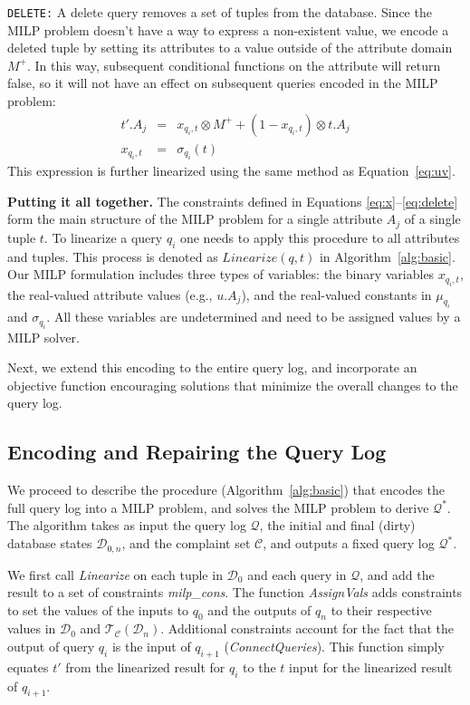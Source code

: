 \smallskip
\noindent
\texttt{DELETE:}
A delete query removes a set of tuples from the database.  
Since the MILP problem doesn't have a way to express a non-existent value, 
we encode a deleted tuple by setting its attributes to a value
outside of the attribute domain $M^+$.  In this way, subsequent conditional functions
on the attribute will return false, so it will not have an effect on subsequent queries encoded
in the MILP problem:
\begin{eqnarray}
\label{eq:delete}
t'.A_j &=& x_{q_i, t} \otimes M^+ + (1-x_{q_i, t}) \otimes t.A_j \\
x_{q_i, t} &=& \sigma_{q_i}(t)\nonumber 
\end{eqnarray}
This expression is further linearized using the same method as Equation~\eqref{eq:uv}.

\smallskip
\noindent
\textbf{Putting it all together.}
The constraints defined in Equations \eqref{eq:x}--\eqref{eq:delete}
form the main structure of the MILP problem for a single attribute
$A_j$ of a single tuple $t$. To linearize a query $q_i$ one needs to
apply this procedure to all attributes and tuples. This process is
denoted as $Linearize(q, t)$ in Algorithm~\ref{alg:basic}. Our MILP
formulation includes three types of variables: the binary variables
$x_{q_i, t}$, the real-valued attribute values (e.g., $u.A_j$), and
the real-valued constants in $\mu_{q_i}$ and $\sigma_{q_i}$. All these
variables are undetermined and need to be assigned values by a MILP
solver.


Next, we extend this encoding to the entire query log,
and incorporate an objective function encouraging solutions
that minimize the overall changes to the query log.







\subsection{Encoding and Repairing the Query Log}
\label{sec:milp}

We proceed to describe the procedure (Algorithm~\ref{alg:basic}) that encodes 
the full query log into a MILP problem, and solves the MILP problem to derive $\mathcal{Q}^*$.
The algorithm takes as input the query log $\mathcal{Q}$, 
the initial and final (dirty) database states 
$\mathcal{D}_{0, n}$, and the complaint set $\mathcal{C}$, and outputs a fixed query 
log $\mathcal{Q}^*$.  

We first call \textit{Linearize} on each tuple in $\mathcal{D}_0$ and
each query in $\mathcal{Q}$, and add the result to a set of
constraints \textit{milp\_cons}. The function \textit{AssignVals} adds
constraints to set the values of the inputs to $q_0$ and the outputs
of $q_n$ to their respective values in $\mathcal{D}_0$ and
$\mathcal{T}_\mathcal{C}(\mathcal{D}_n)$. Additional constraints
account for the fact that the output of query $q_i$ is the input of
$q_{i+1}$ (\textit{ConnectQueries}). This function simply equates $t'$
from the linearized result for $q_i$ to the $t$ input for the
linearized result of $q_{i+1}$.

